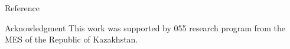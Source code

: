\documentclass[final,t]{beamer}
\begin{document}
\begin{frame}{}
\begin{columns}[t]
\begin{column}{.3\linewidth}
\begin{block}{Reference}
      \end{block}

      \begin{block}{Acknowledgment}
	\small{This work was supported by 055 research program from the MES of the Republic of Kazakhstan.}
      \end{block}

    \end{column}
  \end{columns}
\end{frame}

\end{document}

